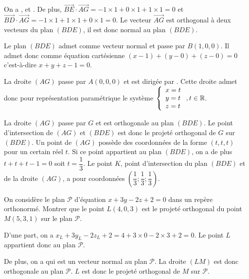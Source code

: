 \documentclass[11pt,fleqn, openany]{book} %
\begin{document}
\begin{solution}On a ,  et . De plus, $\overrightarrow{BE}\cdot \overrightarrow{AG}=-1 \times 1 + 0 \times 1 + 1 \times 1 = 0$ et $\overrightarrow{BD}\cdot \overrightarrow{AG}=-1 \times 1 + 1 \times 1 + 0 \times 1 = 0$. Le vecteur $\overrightarrow{AG}$ est orthogonal à deux vecteurs du plan $(BDE)$, il est donc normal au plan $(BDE)$.

Le plan $(BDE)$ admet  comme vecteur normal et passe par $B(1,0,0)$. Il admet donc comme équation cartésienne $(x-1)+(y-0)+(z-0)=0$ c'est-à-dire $x+y+z-1=0$.

 La droite $(AG)$ passe par $A(0,0,0)$ et est dirigée par . Cette droite admet donc pour représentation paramétrique le système $\left\{ \renewcommand{\arraystretch}{1}\renewcommand{\arraystretch}{1}\begin{array}{l}x=t \\ y=t \\ z = t \\
\end{array}\right., t \in \mathbb{R}$.

La droite $(AG)$ passe par $G$ et est orthogonale au plan $(BDE)$. Le point d'intersection de $(AG)$ et $(BDE)$ est donc le projeté orthogonal de $G$ sur $(BDE)$. Un point de $(AG)$ possède des coordonnées de la forme $(t,t,t)$ pour un certain réel $t$. Si ce point appartient au plan $(BDE)$, on a de plus $t+t+t-1=0$ soit $t=\dfrac{1}{3}$. Le point $K$, point d'intersection du plan $(BDE)$ et de la droite $(AG)$, a pour coordonnées $\left(\dfrac{1}{3};\dfrac{1}{3};\dfrac{1}{3}\right)$.\end{solution}



\begin{exercise}[subtitle={(Amérique du nord 2021)}] On considère le plan $\mathcal{P}$ d'équation $x+3y-2z+2=0$ dans un repère orthonormé. Montrer que le point $L(4, 0, 3)$ est le projeté orthogonal du point $M(5, 3, 1)$ sur le plan $\mathcal{P}$.\newpage \end{exercise}

\begin{solution}D'une part, on a $x_L+3y_L-2z_L+2=4+3\times 0-2\times 3+2=0$. Le point $L$ appartient donc au plan $\mathcal{P}$.

De plus, on a  qui est un vecteur normal au plan $\mathcal{P}$. La droite $(LM)$ est donc orthogonale au plan $\mathcal{P}$. $L$ est donc le projeté orthogonal de $M$ sur $\mathcal{P}$.\end{solution}
\end{document}
